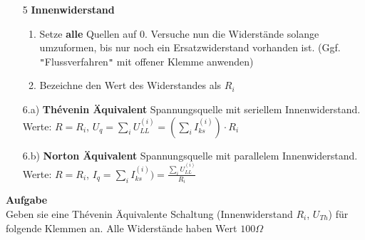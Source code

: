 										  \iend
										\begin{itemize}

										  \item[5] \textbf{Innenwiderstand}
										  \begin{enumerate}
										    \item Setze \textbf{alle} Quellen auf 0. Versuche nun die Widerstände solange umzuformen, bis nur noch ein Ersatzwiderstand vorhanden ist. (Ggf. \texttt{"}Flussverfahren\texttt{"} mit offener Klemme anwenden)
										    \item Bezeichne den Wert des Widerstandes als $R_i$
										  \end{enumerate}
										  \item[6.a)] \textbf{Thévenin Äquivalent} Spannungsquelle mit seriellem Innenwiderstand. \\
										  Werte: $\displaystyle   R= R_i$, $U_q = \sum_i U_{LL}^{(i)} = (\sum_i I_{ks}^{(i)})\cdot R_i$

										  \item[6.b)] \textbf{Norton Äquivalent} Spannungsquelle mit parallelem Innenwiderstand. \\
										  Werte: $\displaystyle  R= R_i$, $I_q = \sum_i I_{ks}^{(i)}) = \frac{\sum_i U_{LL}^{(i)}}{R_i}$

										  \end{itemize}

										\iend






										\beginip
										\textbf{Aufgabe}
										\\Geben sie eine Thévenin Äquivalente Schaltung (Innenwiderstand $R_i$, $U_{Th}$) für folgende Klemmen an. Alle Widerstände haben Wert $100\Omega$ \\

